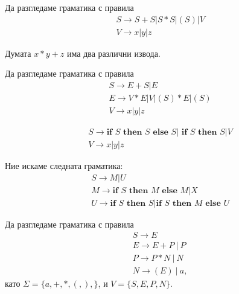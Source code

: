 \begin{example}
  Да разгледаме граматика с правила
  \begin{align*}
    & S \to S + S | S * S | (S) | V\\
    & V \to x | y | z
  \end{align*}

  Думата $x * y + z$ има два различни извода.

  Да разгледаме граматика с правила
  \begin{align*}
    & S \to E + S | E\\
    & E \to V * E | V | (S) * E | (S)\\
    & V \to x | y | z
  \end{align*}
\end{example}

\begin{example}
  \begin{align*}
    & S \to \textbf{if } S \textbf{ then } S \textbf{ else }S | \textbf{ if }S \textbf{ then }S | V\\
    & V \to x | y | z
  \end{align*}

  Ние искаме следната граматика:
  \begin{align*}
    & S \to M | U\\
    & M \to \textbf{if } S \textbf{ then } M \textbf{ else }M | X\\
    & U \to \textbf{if } S \textbf{ then } S | \textbf{if } S \textbf{ then } M \textbf{ else }U
  \end{align*}
\end{example}



\begin{example}
  Да разгледаме граматика с правила
  \begin{align*}
    & S \to E\\
    & E \to E + P\ |\ P\\
    & P \to P * N\ |\ N\\
    & N \to (E)\ |\ a,
  \end{align*}
  като $\Sigma = \{a,+,*,(,),\}$, и $V = \{S,E,P,N\}$.
\end{example}

